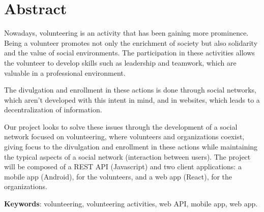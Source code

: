 \section*{Abstract}
Nowadays, volunteering is an activity that has been gaining more prominence.
Being a volunteer promotes not only the enrichment of society but also solidarity and the value of social environments. The participation in these activities allows the volunteer to develop skills such as leadership and teamwork, which are valuable in a professional environment. \par \smallskip
The divulgation and enrollment in these actions is done through social networks, which aren't developed with this intent in mind, and in websites, which leads to a decentralization of information. \par \smallskip
Our project looks to solve these issues through the development of a social network focused on volunteering, where volunteers and organizations coexist, giving focus to the divulgation and enrollment in these actions while maintaining the typical aspects of a social network (interaction between users). The project will be composed of a REST API (Javascript) and two client applications: a mobile app (Android), for the volunteers, and a web app (React), for the organizations. \par \smallskip
\textbf{Keywords}: volunteering, volunteering activities, web API, mobile app, web app.